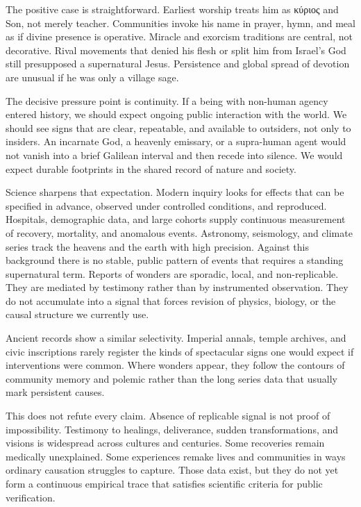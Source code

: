 The positive case is straightforward.
Earliest worship treats him as κύριος and Son, not merely teacher.
Communities invoke his name in prayer, hymn, and meal as if divine presence is operative.
Miracle and exorcism traditions are central, not decorative.
Rival movements that denied his flesh or split him from Israel’s God still presupposed a supernatural Jesus.
Persistence and global spread of devotion are unusual if he was only a village sage.

The decisive pressure point is continuity.
If a being with non-human agency entered history, we should expect ongoing public interaction with the world.
We should see signs that are clear, repeatable, and available to outsiders, not only to insiders.
An incarnate God, a heavenly emissary, or a supra-human agent would not vanish into a brief Galilean interval and then recede into silence.
We would expect durable footprints in the shared record of nature and society.

Science sharpens that expectation.
Modern inquiry looks for effects that can be specified in advance, observed under controlled conditions, and reproduced.
Hospitals, demographic data, and large cohorts supply continuous measurement of recovery, mortality, and anomalous events.
Astronomy, seismology, and climate series track the heavens and the earth with high precision.
Against this background there is no stable, public pattern of events that requires a standing supernatural term.
Reports of wonders are sporadic, local, and non-replicable.
They are mediated by testimony rather than by instrumented observation.
They do not accumulate into a signal that forces revision of physics, biology, or the causal structure we currently use.

Ancient records show a similar selectivity.
Imperial annals, temple archives, and civic inscriptions rarely register the kinds of spectacular signs one would expect if interventions were common.
Where wonders appear, they follow the contours of community memory and polemic rather than the long series data that usually mark persistent causes.

This does not refute every claim.
Absence of replicable signal is not proof of impossibility.
Testimony to healings, deliverance, sudden transformations, and visions is widespread across cultures and centuries.
Some recoveries remain medically unexplained.
Some experiences remake lives and communities in ways ordinary causation struggles to capture.
Those data exist, but they do not yet form a continuous empirical trace that satisfies scientific criteria for public verification.

